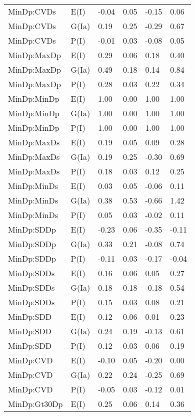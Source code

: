 \begin{center}
\begin{longtable}{|p{1.1in}|p{0.7in}|p{0.7in}|p{0.6in}|p{0.6in}|p{0.6in}|}
  MinDp:CVDs & E(I) & -0.04 & 0.05 & -0.15 & 0.06 \\ 
  MinDp:CVDs & G(Ia) & 0.19 & 0.25 & -0.29 & 0.67 \\ 
  MinDp:CVDs & P(I) & -0.01 & 0.03 & -0.08 & 0.05 \\ 
  MinDp:MaxDp & E(I) & 0.29 & 0.06 & 0.18 & 0.40 \\ 
  MinDp:MaxDp & G(Ia) & 0.49 & 0.18 & 0.14 & 0.84 \\ 
  MinDp:MaxDp & P(I) & 0.28 & 0.03 & 0.22 & 0.34 \\ 
  MinDp:MinDp & E(I) & 1.00 & 0.00 & 1.00 & 1.00 \\ 
  MinDp:MinDp & G(Ia) & 1.00 & 0.00 & 1.00 & 1.00 \\ 
  MinDp:MinDp & P(I) & 1.00 & 0.00 & 1.00 & 1.00 \\ 
  MinDp:MaxDs & E(I) & 0.19 & 0.05 & 0.09 & 0.28 \\ 
  MinDp:MaxDs & G(Ia) & 0.19 & 0.25 & -0.30 & 0.69 \\ 
  MinDp:MaxDs & P(I) & 0.18 & 0.03 & 0.12 & 0.25 \\ 
  MinDp:MinDs & E(I) & 0.03 & 0.05 & -0.06 & 0.11 \\ 
  MinDp:MinDs & G(Ia) & 0.38 & 0.53 & -0.66 & 1.42 \\ 
  MinDp:MinDs & P(I) & 0.05 & 0.03 & -0.02 & 0.11 \\ 
  MinDp:SDDp & E(I) & -0.23 & 0.06 & -0.35 & -0.11 \\ 
  MinDp:SDDp & G(Ia) & 0.33 & 0.21 & -0.08 & 0.74 \\ 
  MinDp:SDDp & P(I) & -0.11 & 0.03 & -0.17 & -0.04 \\ 
  MinDp:SDDs & E(I) & 0.16 & 0.06 & 0.05 & 0.27 \\ 
  MinDp:SDDs & G(Ia) & 0.18 & 0.18 & -0.18 & 0.54 \\ 
  MinDp:SDDs & P(I) & 0.15 & 0.03 & 0.08 & 0.21 \\ 
  MinDp:SDD & E(I) & 0.12 & 0.06 & 0.01 & 0.23 \\ 
  MinDp:SDD & G(Ia) & 0.24 & 0.19 & -0.13 & 0.61 \\ 
  MinDp:SDD & P(I) & 0.12 & 0.03 & 0.06 & 0.19 \\ 
  MinDp:CVD & E(I) & -0.10 & 0.05 & -0.20 & 0.00 \\ 
  MinDp:CVD & G(Ia) & 0.22 & 0.24 & -0.25 & 0.69 \\ 
  MinDp:CVD & P(I) & -0.05 & 0.03 & -0.12 & 0.01 \\ 
  MinDp:Gt30Dp & E(I) & 0.25 & 0.06 & 0.14 & 0.36 \\ 

\end{longtable}
\end{center}
